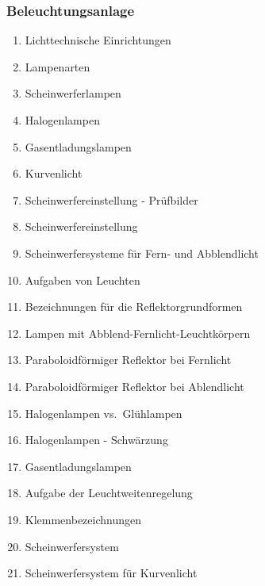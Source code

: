 \subsubsection{Beleuchtungsanlage}\label{beleuchtungsanlage}

\begin{enumerate}
\item
  Lichttechnische Einrichtungen\\
\item
  Lampenarten\\
\item
  Scheinwerferlampen\\
\item
  Halogenlampen\\
\item
  Gasentladungslampen\\
\item
  Kurvenlicht\\
\item
  Scheinwerfereinstellung - Prüfbilder\\
\item
  Scheinwerfereinstellung\\
\item
  Scheinwerfersysteme für Fern- und Abblendlicht\\
\item
  Aufgaben von Leuchten\\
\item
  Bezeichnungen für die Reflektorgrundformen\\
\item
  Lampen mit Abblend-Fernlicht-Leuchtkörpern\\
\item
  Paraboloidförmiger Reflektor bei Fernlicht\\
\item
  Paraboloidförmiger Reflektor bei Ablendlicht\\
\item
  Halogenlampen vs.~Glühlampen\\
\item
  Halogenlampen - Schwärzung\\
\item
  Gasentladungslampen\\
\item
  Aufgabe der Leuchtweitenregelung\\
\item
  Klemmenbezeichnungen\\
\item
  Scheinwerfersystem\\
\item
  Scheinwerfersystem für Kurvenlicht
\end{enumerate}

